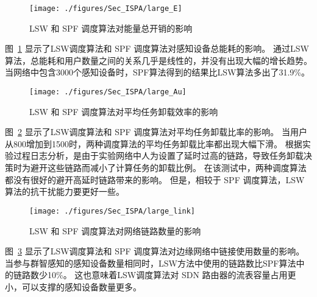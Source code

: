 \begin{figure}[!h]
  \centering
  \texttt{[image: ./figures/Sec\_ISPA/large\_E]}
  \vspace{-0.5em}
  \caption{ LSW 和 SPF 调度算法对能量总开销的影响}
  \label{fig_largeE}
  \vspace{-1em}
\end{figure}

图~\ref{fig_largeE} 显示了LSW调度算法和 SPF 调度算法对感知设备总能耗的影响。
通过LSW算法，总能耗和用户数量之间的关系几乎是线性的，并没有出现大幅的增长趋势。
当网络中包含3000个感知设备时，SPF算法得到的结果比LSW算法多出了31.9\%。

\begin{figure}[!h]
  \centering
  \texttt{[image: ./figures/Sec\_ISPA/large\_Au]}
  \vspace{-0.5em}
  \caption{ LSW 和 SPF 调度算法对平均任务卸载效率的影响}
  \vspace{-1em}
  \label{fig_largeAu}
\end{figure}

图~\ref{fig_largeAu} 显示了LSW调度算法和 SPF 调度算法对平均任务卸载比率的影响。
当用户从800增加到1500时，两种调度算法的平均任务卸载比率都出现大幅下滑。
根据实验过程日志分析，是由于实验网络中人为设置了延时过高的链路，导致任务卸载决策时为避开这些链路而减小了计算任务的卸载比例。
在该测试中，两种调度算法都没有很好的避开高延时链路带来的影响。
但是，相较于 SPF 调度算法，LSW算法的抗干扰能力要更好一些。

\begin{figure}[!h]
  \centering
  \texttt{[image: ./figures/Sec\_ISPA/large\_link]}
  \vspace{-0.5em}
  \caption{ LSW 和 SPF 调度算法对网络链路数量的影响}
  \label{fig_largeL}
\end{figure}

图~\ref{fig_largeL} 显示了LSW调度算法和 SPF 调度算法对边缘网络中链接使用数量的影响。当参与群智感知的感知设备数量相同时，LSW方法中使用的链路数比SPF算法中的链路数少10\%。
这也意味着LSW调度算法对 SDN 路由器的流表容量占用更小，可以支撑的感知设备数量更多。







